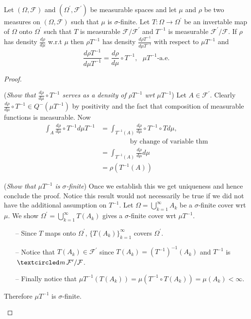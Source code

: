 \begin{theorem} Let $(\Omega, \mathcal F)$ and $(\Omega^\prime, \mathcal F^\prime)$  be measurable spaces and let $\mu$ and $\rho$ be two measures on $(\Omega, \mathcal F)$ such that $\mu$ is $\sigma$-finite. Let $T:\Omega \rightarrow \Omega^\prime$ be an invertable map of $\Omega$ onto $\Omega^\prime$ such that $T$ is measurable $\mathcal F/\mathcal F^\prime$  and $T^{-1}$ is measurable $\mathcal F^\prime/\mathcal F$. If $\rho$ has density $\frac{d\rho}{d\mu}$ w.r.t $\mu$ then $\rho T^{-1}$ has density  $\frac{d\rho T^{-1}}{d\mu T^{-1}}$ with respect to $\mu T^{-1}$ and
\[ \frac{d\rho T^{-1}}{d\mu T^{-1}} = \frac{d\rho}{d\mu}\circ T^{-1},\text{ $\mu T^{-1}$-a.e.} \]
\end{theorem}
\begin{proof}
$\phantom{asdf}$


\begin{flushleft}
\textbullet({\sl Show that $\frac{d\rho}{d\mu}\circ T^{-1}$ serves as a density of $\rho T^{-1}$ wrt $\mu T^{-1}$}) Let $A\in \mathcal F^\prime$. Clearly $\frac{d\rho}{d\mu}\circ T^{-1}\in Q^-(\mu T^{-1})$ by positivity and the fact that composition of measurable functions is measurable. Now
\begin{align*}
\int_A \frac{d\rho}{d\mu}\circ T^{-1} d\mu T^{-1}
&= \int_{T^{-1}(A)} \frac{d\rho}{d\mu}\circ T^{-1}\circ T d\mu,\\
&\qquad\qquad\text{ by change of variable thm}\\
&= \int_{T^{-1}(A)} \frac{d\rho}{d\mu} d\mu\\
&=  \rho(T^{-1}(A))
\end{align*}
\end{flushleft}

\begin{flushleft}
\textbullet({\sl Show that $\mu T^{-1}$ is $\sigma$-finite})
Once we establish this we get uniqueness and hence conclude the proof. Notice this result would not necessarily be true if we did not have the additional assumption on $T^{-1}$. Let $\Omega = \bigcup_{k=1}^\infty A_k$ be a $\sigma$-finite cover wrt $\mu$. We show $\Omega^\prime = \bigcup_{k=1}^\infty T(A_k)$ gives a $\sigma$-finite cover wrt $\mu T^{-1}$.
\begin{itemize}
\item[--] Since $T$ maps onto $\Omega^\prime$, $\{ T(A_k) \}_{k=1}^\infty$  covers $\Omega^\prime$.
\item[--] Notice that $T(A_k)\in \mathcal F^\prime$ since  $T(A_k) = (T^{-1})^{-1}(A_k)$ and $T^{-1}$ is $\mcirc \mathcal F^\prime/\mathcal F$.
\item[--] Finally notice that $\mu T^{-1}(T(A_k)) = \mu(T^{-1}\circ T(A_k))=\mu(A_k)<\infty$.
\end{itemize}
Therefore $\mu T^{-1}$ is $\sigma$-finite.
\end{flushleft}
\end{proof}



